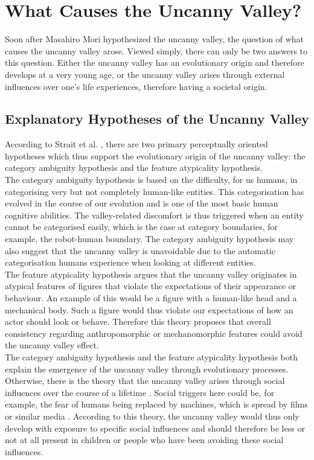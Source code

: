 \chapter{What Causes the Uncanny Valley?}   
\label{chap:4}
Soon after Masahiro Mori hypothesized the uncanny valley, the question of what causes the uncanny valley arose. Viewed simply, there can only be two answers to this question. Either the uncanny valley has an evolutionary origin and therefore develops at a very young age, or the uncanny valley arises through external influences over one's life experiences, therefore having a societal origin. 
\section{Explanatory Hypotheses of the Uncanny Valley}
According to Strait et al. \cite{childrens_responding}, there are two primary perceptually oriented hypotheses which thus support the evolutionary origin of the uncanny valley: the category ambiguity hypothesis and the feature atypicality hypothesis.\\
The category ambiguity hypothesis \cite{childrens_responding} is based on the difficulty, for us humans, in categorising very but not completely human-like entities. This categorisation has evolved in the course of our evolution and is one of the most basic human cognitive abilities. The valley-related discomfort is thus triggered when an entity cannot be categorised easily, which is the case at category boundaries, for example, the robot-human boundary. The category ambiguity hypothesis may also suggest that the uncanny valley is unavoidable due to the automatic categorisation humans experience when looking at different entities.\\
The feature atypicality hypothesis \cite{childrens_responding} argues that the uncanny valley originates in atypical features of figures that violate the expectations of their appearance or behaviour. An example of this would be a figure with a human-like head and a mechanical body. Such a figure would thus violate our expectations of how an actor should look or behave. Therefore this theory proposes that overall consistency regarding anthropomorphic or mechanomorphic features could avoid the uncanny valley effect.\\
The category ambiguity hypothesis and the feature atypicality hypothesis both explain the emergence of the uncanny valley through evolutionary processes. Otherwise, there is the theory that the uncanny valley arises through social influences over the course of a lifetime \cite{childrens_responding}. Social triggers here could be, for example, the fear of humans being replaced by machines, which is spread by films or similar media \cite{childrens_responding}. According to this theory, the uncanny valley would thus only develop with exposure to specific social influences and should therefore be less or not at all present in children or people who have been avoiding these social influences. 
